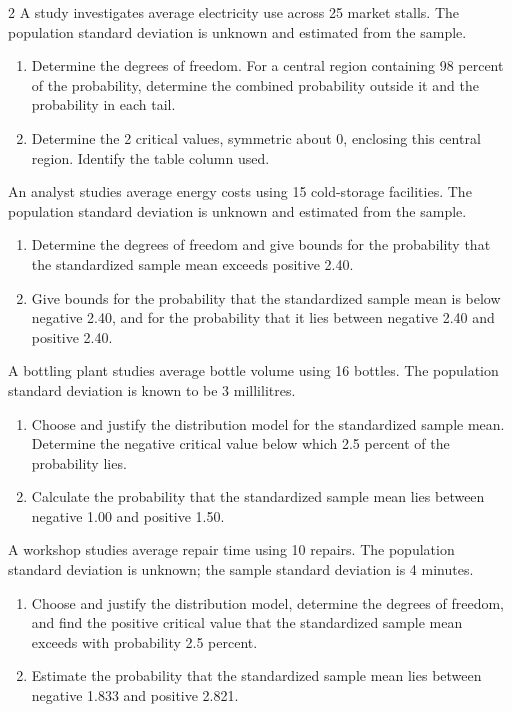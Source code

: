 \begin{multicols}{2}
A study investigates average electricity use across 25 market stalls. The population standard deviation is unknown and estimated from the sample.
\begin{enumerate}[label=\textbf{(\alph*)},leftmargin=*]
\item Determine the degrees of freedom. For a central region containing 98 percent of the probability, determine the combined probability outside it and the probability in each tail. 
\item Determine the 2 critical values, symmetric about 0, enclosing this central region. Identify the table column used. 
\end{enumerate}

An analyst studies average energy costs using 15 cold-storage facilities. The population standard deviation is unknown and estimated from the sample.
\begin{enumerate}[label=\textbf{(\alph*)},leftmargin=*]
\item Determine the degrees of freedom and give bounds for the probability that the standardized sample mean exceeds positive 2.40. 
\item Give bounds for the probability that the standardized sample mean is below negative 2.40, and for the probability that it lies between negative 2.40 and positive 2.40. 
\end{enumerate}

A bottling plant studies average bottle volume using 16 bottles. The population standard deviation is known to be 3 millilitres.
\begin{enumerate}[label=\textbf{(\alph*)},leftmargin=*]
\item Choose and justify the distribution model for the standardized sample mean. Determine the negative critical value below which 2.5 percent of the probability lies. 
\item Calculate the probability that the standardized sample mean lies between negative 1.00 and positive 1.50. 
\end{enumerate}

A workshop studies average repair time using 10 repairs. The population standard deviation is unknown; the sample standard deviation is 4 minutes.
\begin{enumerate}[label=\textbf{(\alph*)},leftmargin=*]
\item Choose and justify the distribution model, determine the degrees of freedom, and find the positive critical value that the standardized sample mean exceeds with probability 2.5 percent. 
\item Estimate the probability that the standardized sample mean lies between negative 1.833 and positive 2.821. 
\end{enumerate}


\end{multicols}
